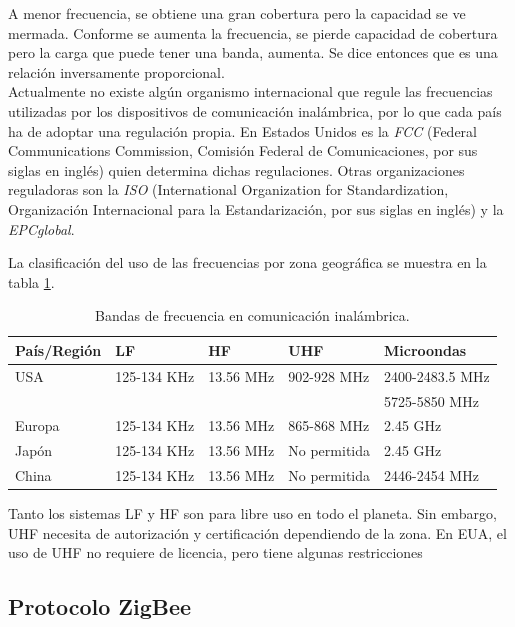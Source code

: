 A menor frecuencia, se obtiene una gran cobertura pero la capacidad se ve mermada. Conforme se aumenta la frecuencia, se pierde capacidad de cobertura pero la carga que puede tener una banda, aumenta. Se dice entonces que es una relación inversamente proporcional.\\

Actualmente no existe algún organismo internacional que regule las frecuencias utilizadas por los dispositivos de comunicación inalámbrica, por lo que cada país ha de adoptar una regulación propia. En Estados Unidos es la \textit{FCC} (Federal Communications Commission, Comisión Federal de Comunicaciones, por sus siglas en inglés) quien determina dichas regulaciones. Otras organizaciones reguladoras son la \textit{ISO} (International Organization for Standardization, Organización Internacional para la Estandarización, por sus siglas en inglés) y la \textit{EPCglobal}.

La clasificación del uso de las frecuencias por zona geográfica se muestra en la tabla \ref{Tab:BandasFreq}.

\begin{table}[!htb]
\begin{center}
\caption{Bandas de frecuencia en comunicación inalámbrica.}
\label{Tab:BandasFreq}
\begin{tabular}{|l|l|l|l|l|}
	\hline
	\textbf{País/Región} & \textbf{LF} & \textbf{HF} & \textbf{UHF} & \textbf{Microondas}\\
	\hline
	USA & 125-134 KHz & 13.56 MHz & 902-928 MHz & 2400-2483.5 MHz\\& & & & 5725-5850 MHz \\
	\hline
	Europa & 125-134 KHz & 13.56 MHz & 865-868 MHz & 2.45 GHz \\
	\hline
	Japón & 125-134 KHz & 13.56 MHz & No permitida & 2.45 GHz \\
	\hline
	China & 125-134 KHz & 13.56 MHz & No permitida & 2446-2454 MHz \\
	\hline
\end{tabular}
\end{center}
\end{table}

Tanto los sistemas LF y HF son para libre uso en todo el planeta. Sin embargo, UHF necesita de autorización y certificación dependiendo de la zona. En EUA, el uso de UHF no requiere de licencia, pero tiene algunas restricciones \cite{tapia2007identificacion}

\subsection{Protocolo ZigBee}

